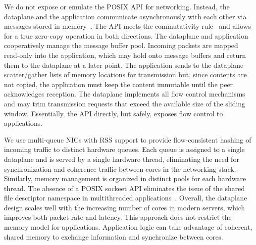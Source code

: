  We do
not expose or emulate the POSIX API for networking.  Instead, the
dataplane and the application communicate asynchronously with each
other via messages stored in
memory~\cite{DBLP:conf/osdi/HanMCR12,DBLP:journals/cacm/Rizzo12}.  The
API meets the commutativity rule~\cite{DBLP:conf/sosp/ClementsKZMK13}
and allows for a true zero-copy operation in both directions. The
dataplane and application cooperatively manage the message buffer
pool. Incoming packets are mapped read-only into the application,
which may hold onto message buffers and return them to the dataplane
at a later point.  The application sends to the dataplane
scatter/gather lists of memory locations for transmission but, since
contents are not copied, the application must keep the content
immutable until the peer acknowledges reception. The dataplane implements
all flow control mechanisms and may trim transmission requests that
exceed the available size of the sliding window.  Essentially, the API
directly, but safely, exposes flow control to applications.


 We use
multi-queue NICs with RSS support to provide flow-consistent hashing
of incoming traffic to distinct hardware queues. Each queue is
assigned to a single dataplane and is served by a single hardware
thread, eliminating the need for synchronization and coherence traffic
between cores in the networking stack. Similarly, memory management is
organized in distinct pools for each hardware thread. The absence of a
POSIX sockeet API eliminates the issue of the shared file descriptor
namespace in multithreaded
applications~\cite{DBLP:conf/sosp/ClementsKZMK13}. Overall, the \ix
dataplane design scales well with the increasing number of cores in
modern servers, which improves both packet rate and latency. This
approach does not restrict the memory model for
applications. Application logic can take advantage of coherent, shared
memory to exchange information and synchronize between cores.




